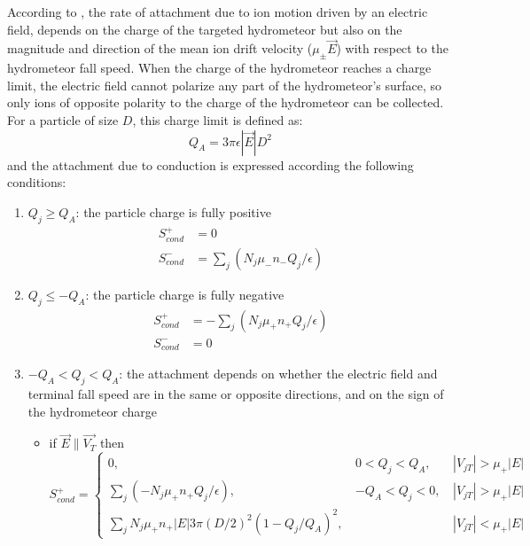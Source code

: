 According to \citet{Chiu-1978}, the rate of attachment due to ion motion driven by an electric field, depends on the charge of the targeted hydrometeor but also on the magnitude and direction of the mean ion drift velocity ($\mu _{\pm} \overrightarrow{E}$) with respect to the hydrometeor fall speed. When the charge of the hydrometeor reaches a charge limit, the electric field cannot polarize any part of the hydrometeor's surface, so only ions of opposite polarity to the charge of the hydrometeor can be collected. For a particle of size $D$, this charge limit is defined as:
\begin{equation}
  Q_A = 3 \pi \epsilon |\overrightarrow{E}|D^2
\end{equation}
and the attachment due to conduction is expressed according the following conditions:
\begin{enumerate}
  \item $Q_j \geq Q_A$: the particle charge is fully positive
    \begin{align}
      S_{cond}^{+} &= 0\\
      S_{cond}^{-} &= \sum_{j} (N_j \mu_{-} n_{-} Q_j / \epsilon)
    \end{align}
  \item $Q_j \leq -Q_A$: the particle charge is fully negative 
    \begin{align}
      S_{cond}^{+} &= -\sum_{j} (N_j \mu_{+} n_{+} Q_j / \epsilon)\\
      S_{cond}^{-} &= 0
    \end{align}
  \item $-Q_A < Q_j < Q_A$: the attachment depends on whether the electric field and terminal fall speed are in the same or opposite directions, and on the sign of the hydrometeor charge
    \begin{itemize}
      \item if $\overrightarrow{E} \parallel \overrightarrow{V_T}$ then 
        \begin{displaymath}
            S_{cond}^{+} = \left\{ 
	 \begin{array}{lll}
                      0 \mbox{, }                                            & 0 < Q_j < Q_A \mbox{, }  & |V_{jT}| > \mu_{+}|E| \\
                      \sum_{j} (-N_j \mu_{+} n_{+} Q_j / \epsilon) \mbox{, } & -Q_A < Q_j < 0 \mbox{, } & |V_{jT}| > \mu_{+}|E| \\
                      \sum_{j} N_j \mu_{+} n_{+} |E| 3 \pi (D/2)^2 (1-Q_j/Q_A)^2 \mbox{, } &    & |V_{jT}| < \mu_{+}|E| 
         \end{array}  \right.
         \end{displaymath}


\end{itemize}
\end{enumerate}
